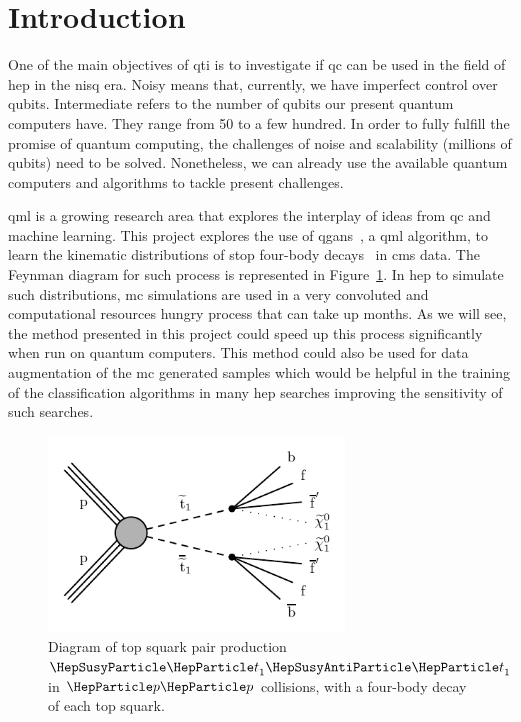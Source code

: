 \section{Introduction}
\label{sec:intro}

One of the main objectives of \gls{qti} is to investigate if \gls{qc} can be 
used in the field of \gls{hep} in the \gls{nisq} era. Noisy means that, currently,
we have imperfect control over qubits. Intermediate refers to the number of qubits
our present quantum computers have. They range from 50 to a few hundred. 
In order to fully fulfill the promise of quantum computing, the challenges of
noise and scalability (millions of qubits) need to be solved. Nonetheless, we
can already use the available quantum computers and algorithms to tackle present
challenges. 

\gls{qml} is a growing research area that explores the interplay of ideas from \gls{qc} 
and machine learning. This project explores the use of \glspl{qgan}~\cite{Zoufal_2019}, 
a \gls{qml} algorithm, to learn the kinematic distributions of stop four-body 
decays~\cite{ph-brief-stop} in \gls{cms} data. The Feynman diagram for such process 
is represented in Figure~\ref{fig:model}. In \gls{hep} to simulate such 
distributions, \gls{mc} simulations are used in a very convoluted and computational
resources hungry process that can take up months. As we will see, the method 
presented in this project could speed up this process significantly when run on 
quantum computers. This method could also be used for data augmentation of the 
\gls{mc} generated samples which would be helpful in the training of the 
classification algorithms in many \gls{hep} searches improving the sensitivity of
such searches.

\clearpage

\begin{figure}[!htbp]
\centering
	\includegraphics[width=0.70\textwidth]{figures/Figure_001.pdf}
\caption{Diagram of top squark pair production $\stp \stpb$ in $\Pp\Pp$ collisions, 
with a four-body decay of each top squark.}
\label{fig:model}
\end{figure}

